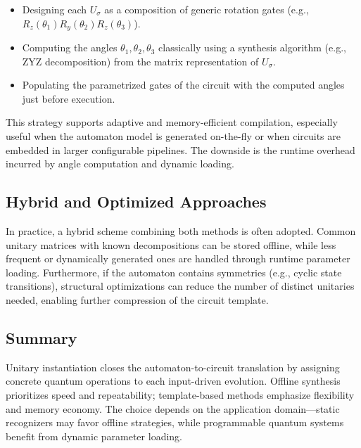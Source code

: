 \begin{itemize}
    \item Designing each $U_{\sigma}$ as a composition of generic rotation gates (e.g., $R_z(\theta_1) R_y(\theta_2) R_z(\theta_3)$).
    \item Computing the angles $\theta_1, \theta_2, \theta_3$ classically using a synthesis algorithm (e.g., ZYZ decomposition) from the matrix representation of $U_{\sigma}$.
    \item Populating the parametrized gates of the circuit with the computed angles just before execution.
\end{itemize}

This strategy supports adaptive and memory-efficient compilation, especially useful when the automaton model is generated on-the-fly or when circuits are embedded in larger configurable pipelines. The downside is the runtime overhead incurred by angle computation and dynamic loading.

\subsection{Hybrid and Optimized Approaches}

In practice, a hybrid scheme combining both methods is often adopted. Common unitary matrices with known decompositions can be stored offline, while less frequent or dynamically generated ones are handled through runtime parameter loading. Furthermore, if the automaton contains symmetries (e.g., cyclic state transitions), structural optimizations can reduce the number of distinct unitaries needed, enabling further compression of the circuit template.

\subsection{Summary}

Unitary instantiation closes the automaton-to-circuit translation by assigning concrete quantum operations to each input-driven evolution. Offline synthesis prioritizes speed and repeatability; template-based methods emphasize flexibility and memory economy. The choice depends on the application domain—static recognizers may favor offline strategies, while programmable quantum systems benefit from dynamic parameter loading.
